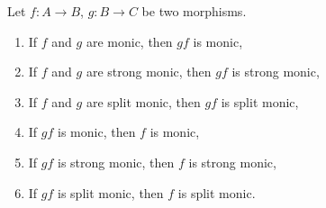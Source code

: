 Let $f\colon A\to B$, $g\colon B\to C$ be two morphisms.
\begin{enumerate}[label=(\alph*)]
	\item If $f$ and $g$ are monic, then $gf$ is monic,
	\item If $f$ and $g$ are strong monic, then $gf$ is strong monic,
	\item If $f$ and $g$ are split monic, then $gf$ is split monic,
	\item If  $gf$ is monic, then $f$ is monic,
	\item If  $gf$ is strong monic, then $f$ is strong monic,
	\item If  $gf$ is split monic, then $f$ is split monic.
\end{enumerate}
